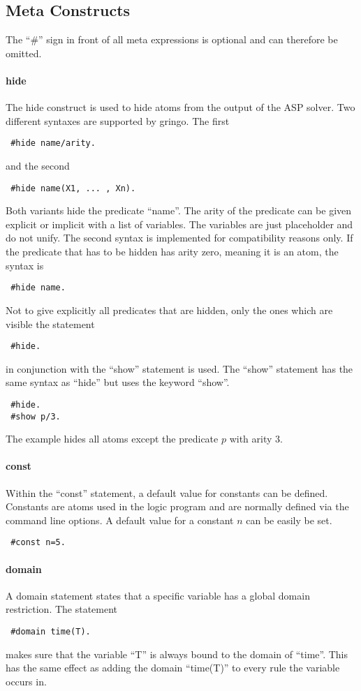 \documentclass[a4paper,10pt]{article}
\begin{document}
\subsection{Meta Constructs}
The ``\#'' sign in front of all meta expressions is optional and can therefore be omitted.
\paragraph{hide}
The hide construct is used to hide atoms from the output of the ASP solver.
Two different syntaxes are supported by gringo.
The first 
\begin{verbatim}
 #hide name/arity.
\end{verbatim}
and the second
\begin{verbatim}
 #hide name(X1, ... , Xn).
\end{verbatim}
Both variants hide the predicate ``name''.
The arity of the predicate can be given explicit or implicit with a list of variables.
The variables are just placeholder and do not unify. The second syntax is implemented for compatibility reasons only.
If the predicate that has to be hidden has arity zero, meaning it is an atom, the syntax is
\begin{verbatim}
 #hide name.
\end{verbatim}
Not to give explicitly all predicates that are hidden, only the ones which are visible the statement
\begin{verbatim}
 #hide.
\end{verbatim}
in conjunction with the ``show'' statement is used.
The ``show'' statement has the same syntax as ``hide'' but uses the keyword ``show''.
\begin{verbatim}
 #hide.
 #show p/3.
\end{verbatim}
The example hides all atoms except the predicate $p$ with arity $3$.
\paragraph{const}
Within the ``const'' statement, a default value for constants can be defined.
Constants are atoms used in the logic program and are normally defined via the command line options.
A default value for a constant $n$ can be easily be set.
\begin{verbatim}
 #const n=5.
\end{verbatim}
\paragraph{domain}
A domain statement states that a specific variable has a global domain restriction.
The statement
\begin{verbatim}
 #domain time(T).
\end{verbatim}
makes sure that the variable ``T'' is always bound to the domain of ``time''.
This has the same effect as adding the domain ``time(T)'' to every rule the variable occurs in.
\end{document}
